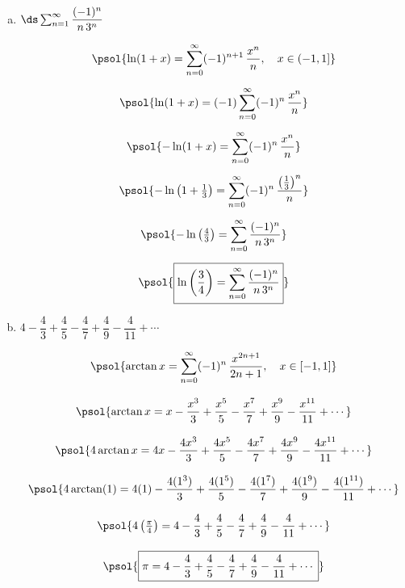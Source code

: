 \documentclass[12pt,letterpaper]{exam}
\begin{document}
\begin{questions}
\begin{enumerate}[(a)]
	\item $\ds\sum_{n=1}^\infty \dfrac{(-1)^n}{n\, 3^n}$ \par\vspace{0.3cm}
		\[
		\begin{gathered}
		\psol{\ln(1 + x)= \sum_{n=0}^\infty (-1)^{n+1} \, \dfrac{x^n}{n}, \quad x \in (-1, 1]} \\[0.2cm]
		\psol{\ln(1 + x)= (-1) \sum_{n=0}^\infty (-1)^n \, \dfrac{x^n}{n}} \\[0.2cm]
		\psol{-\ln(1 + x)= \sum_{n=0}^\infty (-1)^n \, \dfrac{x^n}{n}} \\[0.2cm]
		\psol{-\ln\left(1 + \tfrac{1}{3} \right)= \sum_{n=0}^\infty (-1)^n \, \dfrac{\left( \frac{1}{3} \right)^n}{n}} \\[0.2cm]
		\psol{-\ln\left(\tfrac{4}{3} \right)= \sum_{n=0}^\infty \dfrac{(-1)^n}{n\, 3^n}} \\[0.2cm]
		\psol{\boxed{\ln\left(\dfrac{3}{4} \right)= \sum_{n=0}^\infty \dfrac{(-1)^n}{n\, 3^n}}}
		\end{gathered}
		\] \par\vspace{0.4cm}
	
	\item $4 - \dfrac{4}{3} + \dfrac{4}{5} - \dfrac{4}{7} + \dfrac{4}{9} - \dfrac{4}{11} + \cdots$ \par\vspace{0.3cm}
		\[
		\begin{gathered}
		\psol{\arctan x= \sum_{n=0}^\infty (-1)^n\, \dfrac{x^{2n+1}}{2n + 1}, \quad x \in [-1, 1]} \\[0.3cm]
		\psol{\arctan x= x - \dfrac{x^3}{3} + \dfrac{x^5}{5} - \dfrac{x^7}{7} + \dfrac{x^9}{9} - \dfrac{x^{11}}{11} + \cdots} \\[0.3cm]
		\psol{4\arctan x= 4x - \dfrac{4x^3}{3} + \dfrac{4x^5}{5} - \dfrac{4x^7}{7} + \dfrac{4x^9}{9} - \dfrac{4x^{11}}{11} + \cdots} \\[0.3cm]
		\psol{4 \arctan(1)= 4(1) - \dfrac{4(1^3)}{3} + \dfrac{4(1^5)}{5} - \dfrac{4(1^7)}{7} + \dfrac{4(1^9)}{9} - \dfrac{4(1^{11})}{11} + \cdots} \\[0.3cm]
		\psol{4 \left( \tfrac{\pi}{4} \right)= 4 - \dfrac{4}{3} + \dfrac{4}{5} - \dfrac{4}{7} + \dfrac{4}{9} - \dfrac{4}{11} + \cdots} \\[0.3cm]
		\psol{\boxed{\pi = 4 - \dfrac{4}{3} + \dfrac{4}{5} - \dfrac{4}{7} + \dfrac{4}{9} - \dfrac{4}{11} + \cdots}}
		\end{gathered}
		\]
	\end{enumerate}




\end{questions}
\end{document}
